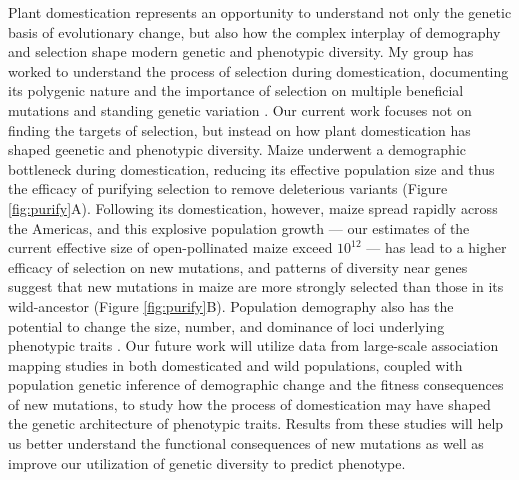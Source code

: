 \documentclass[11pt]{article}
\begin{document}
Plant domestication represents an opportunity to understand not only the genetic basis of evolutionary change, but also how the complex interplay of demography and selection shape modern genetic and phenotypic diversity.
My group has worked to understand the process of selection during domestication, documenting its polygenic nature \citep{hufford2012comparative} and the importance of selection on multiple beneficial mutations \citep{wills2013many} and standing genetic variation \citep{wills2013many, studer2011identification}. 
Our current work focuses not on finding the targets of selection, but instead on how plant domestication has shaped geenetic and phenotypic diversity.
Maize underwent a demographic bottleneck during domestication, reducing its effective population size and thus the efficacy of purifying selection to remove deleterious variants (Figure \ref{fig:purify}A).
Following its domestication, however, maize spread rapidly across the Americas, and this explosive population growth --- our estimates of the current effective size of open-pollinated maize exceed $10^12$ --- has lead to a higher efficacy of selection on new mutations, and patterns of diversity near genes suggest that new mutations in maize are more strongly selected than those in its wild-ancestor (Figure \ref{fig:purify}B).
Population demography also has the potential to change the size, number, and dominance of loci underlying phenotypic traits \citep{lohmueller2014impact,gazave2013population}.
Our future work will utilize data from large-scale association mapping studies in both domesticated and wild populations, coupled with population genetic inference of demographic change and the fitness consequences of new mutations, to study how the process of domestication may have shaped the genetic architecture of phenotypic traits.
Results from these studies will help us better understand the functional consequences of new mutations as well as improve our utilization of genetic diversity to predict phenotype.
\end{document}
